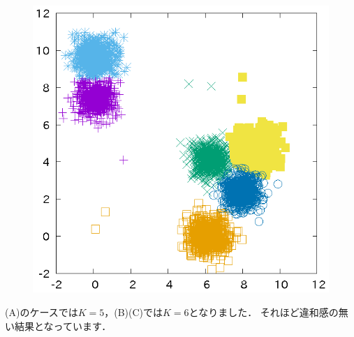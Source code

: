 ﻿\documentclass{jsarticle}
\begin{document}
\begin{figure}[h]
\begin{center}
\begin{minipage}{.32\textwidth}
\begin{center}
 \end{center}
 \end{minipage}
 \begin{minipage}{.32\textwidth}
 \begin{center}
 \includegraphics[height=.18\textheight]{fig/k3.eps}
 \end{center}
 \end{minipage}
\end{center}
\end{figure}
(A)のケースでは$K=5$，(B)(C)では$K=6$となりました．
それほど違和感の無い結果となっています．
\end{document}
